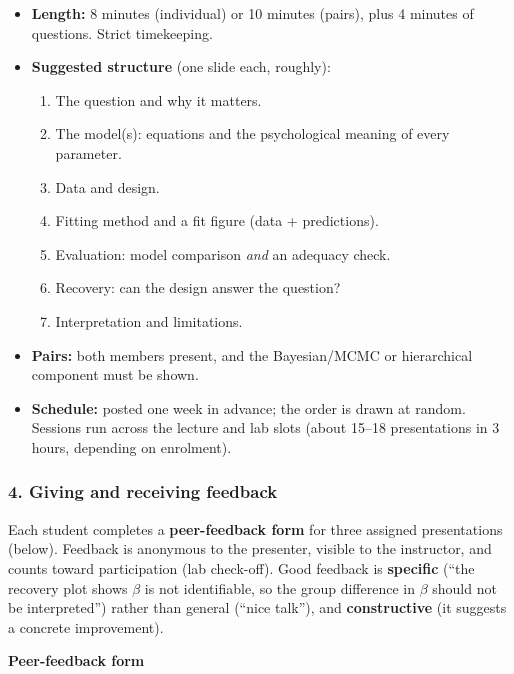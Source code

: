 \begin{itemize}
\tightlist
\item
  \textbf{Length:} 8 minutes (individual) or 10 minutes (pairs), plus 4
  minutes of questions. Strict timekeeping.
\item
  \textbf{Suggested structure} (one slide each, roughly):

  \begin{enumerate}
  \def\labelenumi{\arabic{enumi}.}
  \tightlist
  \item
    The question and why it matters.
  \item
    The model(s): equations and the psychological meaning of every
    parameter.
  \item
    Data and design.
  \item
    Fitting method and a fit figure (data + predictions).
  \item
    Evaluation: model comparison \emph{and} an adequacy check.
  \item
    Recovery: can the design answer the question?
  \item
    Interpretation and limitations.
  \end{enumerate}
\item
  \textbf{Pairs:} both members present, and the Bayesian/MCMC or
  hierarchical component must be shown.
\item
  \textbf{Schedule:} posted one week in advance; the order is drawn at
  random. Sessions run across the lecture and lab slots (about 15--18
  presentations in 3 hours, depending on enrolment).
\end{itemize}

\subsubsection{4. Giving and receiving feedback}

Each student completes a \textbf{peer-feedback form} for three assigned
presentations (below). Feedback is anonymous to the presenter, visible
to the instructor, and counts toward participation (lab check-off). Good
feedback is \textbf{specific} (``the recovery plot shows \(\beta\) is
not identifiable, so the group difference in \(\beta\) should not be
interpreted'') rather than general (``nice talk''), and
\textbf{constructive} (it suggests a concrete improvement).

\textbf{Peer-feedback form}

